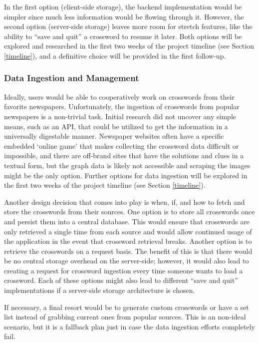 \documentclass{article}
\begin{document}
In the first option (client-side storage), the backend implementation would be simpler since much less information
would be flowing through it. However, the second option (server-side storage) leaves more room
for stretch features, like the ability to ``save and quit'' a crossword to resume it later.
Both options will be explored and researched in the first two weeks of the project timeline (see Section \ref{timeline}), and a definitive choice will be provided in the first follow-up.

\subsubsection{Data Ingestion and Management}
\label{ingestarch}
Ideally, users would be able to cooperatively work on crosswords from their favorite newspapers.
Unfortunately, the ingestion of crosswords from popular newspapers is a non-trivial task. Initial
research did not uncover any simple means, such as an API, that could be utilized to get the information in
a universally digestable manner.  Newspaper websites often have a specific embedded `online game' that makes collecting
the crossword data difficult or impossible, and there are off-brand sites that have the solutions and clues in a textual form,
but the graph data is likely not accessible and scraping the images might be the only option.
Further options for data ingestion will be explored in the first two weeks of the project timeline
(see Section \ref{timeline}).

Another design decision that comes into play is when, if, and how to fetch and store the crosswords from
their sources. One option is to store all crosswords once and persist them into a central database. This would
ensure that crosswords are only retrieved a single time from each source and would allow continued
usage of the application in the event that crossword retrieval breaks. Another option is to retrieve the
crosswords on a request basis. The benefit of this is that there would be no central storage overhead on the server-side; however, it would also lead to creating a request for crossword ingestion every time someone wants to load a crossword.
Each of these options might also lead to different ``save and quit'' implementations if a server-side storage architecture
is chosen.

If necessary, a final resort would be to generate custom crosswords or have a set list
instead of grabbing current ones from popular sources. This is an non-ideal scenario, but it is a fallback plan just in
case the data ingestion efforts completely fail.
\end{document}
